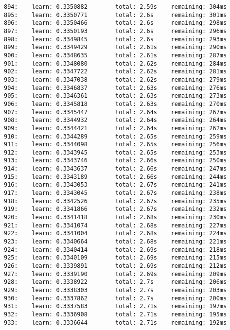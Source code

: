 \documentclass[11pt]{article}
\begin{document}
\begin{Verbatim}[commandchars=\\\{\}]
894:    learn: 0.3350882        total: 2.59s    remaining: 304ms
895:    learn: 0.3350771        total: 2.6s     remaining: 301ms
896:    learn: 0.3350466        total: 2.6s     remaining: 298ms
897:    learn: 0.3350193        total: 2.6s     remaining: 296ms
898:    learn: 0.3349845        total: 2.6s     remaining: 293ms
899:    learn: 0.3349429        total: 2.61s    remaining: 290ms
900:    learn: 0.3348635        total: 2.61s    remaining: 287ms
901:    learn: 0.3348080        total: 2.62s    remaining: 284ms
902:    learn: 0.3347722        total: 2.62s    remaining: 281ms
903:    learn: 0.3347038        total: 2.62s    remaining: 279ms
904:    learn: 0.3346837        total: 2.63s    remaining: 276ms
905:    learn: 0.3346361        total: 2.63s    remaining: 273ms
906:    learn: 0.3345818        total: 2.63s    remaining: 270ms
907:    learn: 0.3345447        total: 2.64s    remaining: 267ms
908:    learn: 0.3344932        total: 2.64s    remaining: 264ms
909:    learn: 0.3344421        total: 2.64s    remaining: 262ms
910:    learn: 0.3344289        total: 2.65s    remaining: 259ms
911:    learn: 0.3344098        total: 2.65s    remaining: 256ms
912:    learn: 0.3343945        total: 2.65s    remaining: 253ms
913:    learn: 0.3343746        total: 2.66s    remaining: 250ms
914:    learn: 0.3343637        total: 2.66s    remaining: 247ms
915:    learn: 0.3343189        total: 2.66s    remaining: 244ms
916:    learn: 0.3343053        total: 2.67s    remaining: 241ms
917:    learn: 0.3343045        total: 2.67s    remaining: 238ms
918:    learn: 0.3342526        total: 2.67s    remaining: 235ms
919:    learn: 0.3341866        total: 2.67s    remaining: 232ms
920:    learn: 0.3341418        total: 2.68s    remaining: 230ms
921:    learn: 0.3341074        total: 2.68s    remaining: 227ms
922:    learn: 0.3341004        total: 2.68s    remaining: 224ms
923:    learn: 0.3340664        total: 2.68s    remaining: 221ms
924:    learn: 0.3340414        total: 2.69s    remaining: 218ms
925:    learn: 0.3340109        total: 2.69s    remaining: 215ms
926:    learn: 0.3339891        total: 2.69s    remaining: 212ms
927:    learn: 0.3339190        total: 2.69s    remaining: 209ms
928:    learn: 0.3338922        total: 2.7s     remaining: 206ms
929:    learn: 0.3338303        total: 2.7s     remaining: 203ms
930:    learn: 0.3337862        total: 2.7s     remaining: 200ms
931:    learn: 0.3337583        total: 2.71s    remaining: 197ms
932:    learn: 0.3336908        total: 2.71s    remaining: 195ms
933:    learn: 0.3336644        total: 2.71s    remaining: 192ms

\end{Verbatim}
\end{document}
